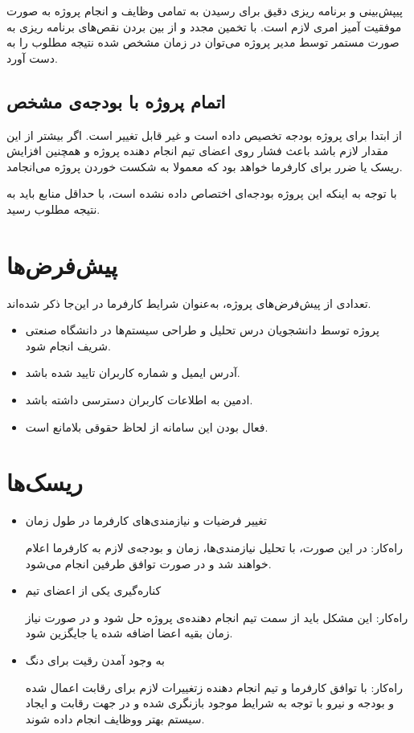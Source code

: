 پیپش‌بینی و برنامه ریزی دقیق برای رسیدن به تمامی وظایف و انجام پروژه به صورت موفقیت آمیز امری لازم است. با تخمین مجدد و از بین بردن نقص‌های برنامه ریزی به صورت مستمر توسط مدیر پروژه می‌توان در زمان مشخص شده نتیجه مطلوب را به دست آورد.

\subsection{اتمام پروژه با بودجه‌ی مشخص}
از ابتدا برای پروژه بودجه تخصیص داده است و غیر قابل تغییر است. اگر بیشتر از این مقدار لازم باشد باعث فشار روی اعضای تیم انجام دهنده پروژه و همچنین افزایش ریسک یا ضرر برای کارفرما خواهد بود که معمولا به شکست خوردن پروژه می‌انجامد.

با توجه به اینکه این پروژه بودجه‌ای اختصاص داده نشده است، با حداقل منابع باید به نتیجه مطلوب رسید.

\section{پیش‌فرض‌ها}
تعدادی از پیش‌فرض‌های پروژه، به‌عنوان شرایط کارفرما در این‌جا ذکر شده‌اند. 
\begin{itemize}
	\item
	پروژه توسط دانشجویان درس تحلیل و طراحی سیستم‌ها در دانشگاه صنعتی شریف انجام شود.
	\item
	آدرس ایمیل و شماره کاربران تایید شده باشد.
	\item 
	ادمین به اطلاعات کاربران دسترسی داشته باشد. 
	\item 
	فعال بودن این سامانه از لحاظ حقوقی بلامانع است.
\end{itemize}

\section{ریسک‌ها}

\begin{itemize}
	\item 
	تغییر فرضیات و نیازمندی‌های کارفرما در طول زمان
	
	راه‌کار:‌ در این صورت، با تحلیل نیازمندی‌ها، زمان و بودجه‌ی لازم به کارفرما اعلام خواهند شد و در صورت توافق طرفین انجام می‌شود.
	\item
	کناره‌گیری یکی از اعضای تیم
	
	راه‌کار: این مشکل باید از سمت تیم انجام دهنده‌ی پروژه حل شود و در صورت نیاز زمان بقیه اعضا اضافه شده یا جایگزین شود.
	\item 
	به وجود آمدن رقیت برای دنگ
	
	راه‌کار:‌ با توافق کارفرما و تیم انجام دهنده زتغییرات لازم برای رقابت اعمال شده و بودجه و نیرو با توجه به شرایط موجود بازنگری شده و در جهت رقابت و ایجاد سیستم بهتر ووظایف انجام داده شوند. 
\end{itemize}

